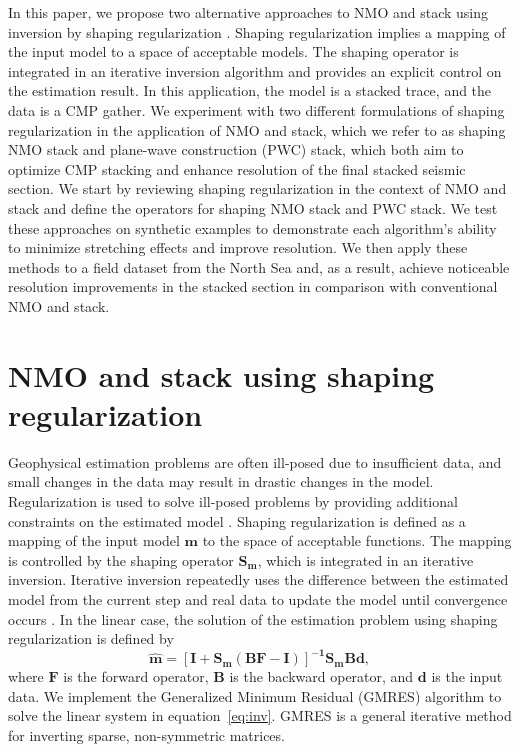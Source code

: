 In this paper, we propose two alternative approaches to NMO and stack using inversion by shaping regularization 
\cite[]{fomel}. Shaping regularization implies a mapping of the input model to a space of acceptable models. 
The shaping operator is integrated in an iterative inversion algorithm and provides an explicit
control on the estimation result. In this application, the model is a stacked trace, and the data is a 
CMP gather. We experiment with two different formulations of shaping regularization in the application of NMO and stack,
 which we refer to as shaping NMO stack and plane-wave construction (PWC) stack, which both aim to optimize CMP stacking and 
 enhance resolution of the final stacked seismic section. We start by reviewing shaping regularization in
 the context of NMO and stack and define the operators for shaping NMO stack and PWC stack. We test these approaches 
on synthetic examples to demonstrate each algorithm's ability to minimize 
stretching effects and improve resolution. We then apply these methods to a field dataset from 
the North Sea and, as a result, achieve noticeable resolution improvements in the stacked section in comparison 
with conventional NMO and stack.


\section{NMO and stack using shaping regularization}
 
Geophysical estimation problems are often ill-posed due to insufficient data, 
and small changes in the data may result in drastic changes in the model. Regularization is 
used to solve ill-posed problems by providing additional constraints on the estimated model \cite[]{zhdanov}.
Shaping regularization is defined as a mapping of the input model $\mathbf{m}$ to the space of acceptable functions. 
The mapping is controlled by the shaping operator $\mathbf{S_m}$, which is integrated in an iterative
inversion. Iterative inversion repeatedly uses the difference between the estimated model from the current step 
and real data to update the model until convergence occurs \cite[]{ronen}. In the linear case, the solution of the estimation problem using 
shaping regularization is defined by
\begin{equation}
\label{eq:inv}
\mathbf{\hat{m}=[I+S_m(BF-I)]^{-1}S_mBd},
\end{equation}
where $\mathbf{F}$ is the forward operator, $\mathbf{B}$ is the backward operator, and $\mathbf{d}$
is the input data. We implement the Generalized Minimum Residual (GMRES) algorithm \cite[]{saad} to solve the linear system in equation~\ref{eq:inv}. 
GMRES is a general iterative method for inverting sparse, non-symmetric matrices.

